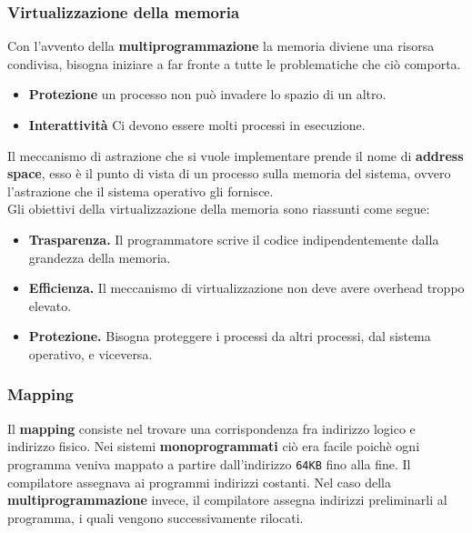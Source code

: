 \documentclass[12pt, twoside, letterpaper]{article}
\begin{document}
			\subsubsection{Virtualizzazione della memoria}
				Con l'avvento della \textbf{multiprogrammazione} la memoria diviene una risorsa condivisa, bisogna iniziare a far fronte a tutte le problematiche che ciò comporta.
				\begin{itemize}
					\item \textbf{Protezione} un processo non può invadere lo spazio di un altro.
					\item \textbf{Interattività} Ci devono essere molti processi in esecuzione.								
				\end{itemize}
				Il meccanismo di astrazione che si vuole implementare prende il nome di \textbf{address space}, esso è il punto di vista di un processo sulla memoria del sistema, ovvero l'astrazione che il sistema operativo gli fornisce.
				\\Gli obiettivi della virtualizzazione della memoria sono riassunti come segue:
				\begin{itemize}
					\item \textbf{Trasparenza.} Il programmatore scrive il codice indipendentemente dalla grandezza della memoria.
					\item \textbf{Efficienza.} Il meccanismo di virtualizzazione non deve avere overhead troppo elevato.
					\item \textbf{Protezione.} Bisogna proteggere i processi da altri processi, dal sistema operativo, e viceversa.
				\end{itemize}
				
			\subsubsection{Mapping}
				Il \textbf{mapping} consiste nel trovare una corrispondenza fra indirizzo logico e indirizzo fisico. Nei sistemi \textbf{monoprogrammati} ciò era facile poichè ogni programma veniva mappato a partire dall'indirizzo \texttt{64KB} fino alla fine. Il compilatore assegnava ai programmi indirizzi costanti. Nel caso della \textbf{multiprogrammazione} invece, il compilatore assegna indirizzi preliminarli al programma, i quali  vengono successivamente rilocati. 
			
\end{document}
